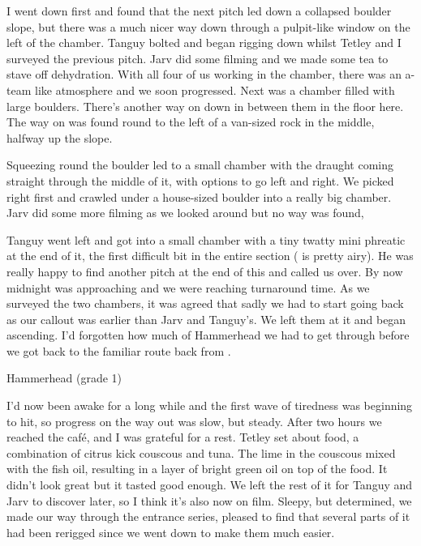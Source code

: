 I went down first and found that the next pitch led down a collapsed boulder slope, but there was a much nicer way down through a pulpit-like window on the left of the chamber. Tanguy bolted and began rigging down whilst Tetley and I surveyed the previous pitch. Jarv did some filming and we made some tea to stave off dehydration. With all four of us working in the chamber, there was an a-team like atmosphere and we soon progressed. Next was a chamber filled with large boulders. There's another way on down in between them in the floor here. The way on was found round to the left of a van-sized rock in the middle, halfway up the slope.

Squeezing round the boulder led to a small chamber with the draught coming straight through the middle of it, with options to go left and right. We picked right first and crawled under a house-sized boulder into a really big chamber. Jarv did some more filming as we looked around but no way was found,  

Tanguy went left and got into a small chamber with a tiny twatty mini phreatic at the end of it, the first difficult bit in the entire section ( is pretty airy). He was really happy to find another pitch at the end of this and called us over. By now midnight was approaching and we were reaching turnaround time. As we surveyed the two chambers, it was agreed that sadly we had to start going back as our callout was earlier than Jarv and Tanguy's. We left them at it and began ascending. I'd forgotten how much of Hammerhead we had to get through before we got back to the familiar route back from .

\begin{survey}[t!]
\checkoddpage \ifoddpage \forcerectofloat \else \forceversofloat \fi
 \centering
{}
\caption[Hammerhead plan (grade 1)]{Hammerhead (grade 1) }
\end{survey}


I'd now been awake for a long while and the first wave of tiredness was beginning to hit, so progress on the way out was slow, but steady. After two hours we reached the café, and I was grateful for a rest. Tetley set about food, a combination of citrus kick couscous and tuna. The lime in the couscous mixed with the fish oil, resulting in a layer of bright green oil on top of the food. It didn't look great but it tasted good enough. We left the rest of it for Tanguy and Jarv to discover later, so I think it's also now on film.  Sleepy, but determined, we made our way through the entrance series, pleased to find that several parts of it had been rerigged since we went down to make them much easier. 

